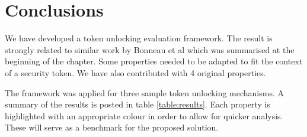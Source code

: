 	
\section{Conclusions}
We have developed a token unlocking evaluation framework. The result is strongly related to similar work by Bonneau et al \cite{bonneau2012quest} which was summarised at the beginning of the chapter. Some properties needed to be adapted to fit the context of a security token. We have also contributed with 4 original properties. 

The framework was applied for three sample token unlocking mechanisms. A summary of the results is posted in table \ref{table:results}. Each property is highlighted with an appropriate colour in order to allow for quicker analysis. These will serve as a benchmark for the proposed solution. 

